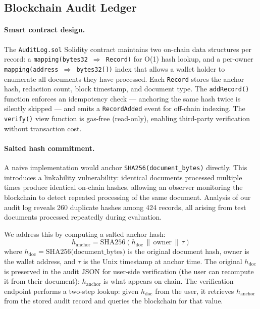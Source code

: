 \documentclass[conference]{IEEEtran}
\begin{document}
\subsection{Blockchain Audit Ledger}

\paragraph{Smart contract design.}
The \texttt{AuditLog.sol} Solidity contract maintains
two on-chain data structures per record:
a \texttt{mapping(bytes32\,$\Rightarrow$\,Record)}
for O(1) hash lookup, and a per-owner
\texttt{mapping(address\,$\Rightarrow$\,bytes32[])}
index that allows a wallet holder to enumerate all
documents they have processed.
Each \texttt{Record} stores the anchor hash,
redaction count, block timestamp, and document type.
The \texttt{addRecord()} function enforces an
idempotency check --- anchoring the same hash twice
is silently skipped --- and emits a
\texttt{RecordAdded} event for off-chain indexing.
The \texttt{verify()} view function is gas-free
(read-only), enabling third-party verification
without transaction cost.

\paragraph{Salted hash commitment.}
A naive implementation would anchor
\texttt{SHA256(document\_bytes)} directly.
This introduces a linkability vulnerability: identical
documents processed multiple times produce identical
on-chain hashes, allowing an observer monitoring the
blockchain to detect repeated processing of the same
document.
Analysis of our audit log reveals 260 duplicate
hashes among 424 records, all arising from test
documents processed repeatedly during evaluation.

We address this by computing a salted anchor hash:
\begin{equation}
  h_{\text{anchor}} = \text{SHA256}(h_{\text{doc}}
    \,\|\, \text{owner} \,\|\, \tau)
  \label{eq:salt}
\end{equation}
where $h_{\text{doc}} = \text{SHA256(document\_bytes)}$
is the original document hash, $\text{owner}$ is the
wallet address, and $\tau$ is the Unix timestamp at
anchor time.
The original $h_{\text{doc}}$ is preserved in the
audit JSON for user-side verification (the user can
recompute it from their document);
$h_{\text{anchor}}$ is what appears on-chain.
The verification endpoint performs a two-step lookup:
given $h_{\text{doc}}$ from the user, it retrieves
$h_{\text{anchor}}$ from the stored audit record and
queries the blockchain for that value.
\end{document}
